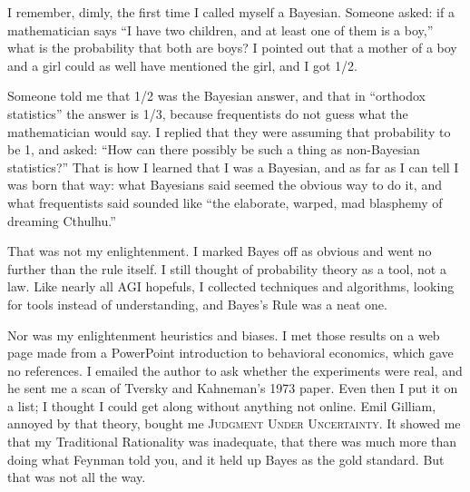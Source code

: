 
I remember, dimly, the first time I called myself a Bayesian. Someone asked: if a mathematician says ``I have two children, and at least one of them is a boy,'' what is the probability that both are boys? I pointed out that a mother of a boy and a girl could as well have mentioned the girl, and I got 1/2. 

Someone told me that 1/2 was the Bayesian answer, and that in ``orthodox statistics'' the answer is 1/3, because frequentists do not guess what the mathematician would say. I replied that they were assuming that probability to be 1, and asked: ``How can there possibly be such a thing as non-Bayesian statistics?'' That is how I learned that I was a Bayesian, and as far as I can tell I was born that way: what Bayesians said seemed the obvious way to do it, and what frequentists said sounded like ``the elaborate, warped, mad blasphemy of dreaming Cthulhu.'' 

That was not my enlightenment. I marked Bayes off as obvious and went no further than the rule itself. I still thought of probability theory as a tool, not a law. Like nearly all AGI hopefuls, I collected techniques and algorithms, looking for tools instead of understanding, and Bayes's Rule was a neat one.

Nor was my enlightenment heuristics and biases. I met those results on a web page made from a PowerPoint introduction to behavioral economics, which gave no references. I emailed the author to ask whether the experiments were real, and he sent me a scan of Tversky and Kahneman's 1973 paper. Even then I put it on a list; I thought I could get along without anything not online. Emil Gilliam, annoyed by that theory, bought me \textsc{Judgment Under Uncertainty}. It showed me that my Traditional Rationality was inadequate, that there was much more than doing what Feynman told you, and it held up Bayes as the gold standard. But that was not all the way.

